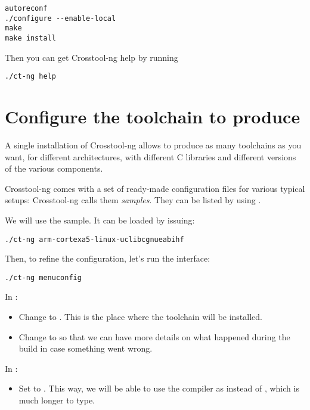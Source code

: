 \begin{verbatim}
autoreconf
./configure --enable-local
make
make install
\end{verbatim}

Then you can get Crosstool-ng help by running

\begin{verbatim}
./ct-ng help
\end{verbatim}

\section{Configure the toolchain to produce}

A single installation of Crosstool-ng allows to produce as many
toolchains as you want, for different architectures, with different C
libraries and different versions of the various components.

Crosstool-ng comes with a set of ready-made configuration files for
various typical setups: Crosstool-ng calls them {\em samples}. They can be
listed by using .

We will use the  sample. It
can be loaded by issuing:

\begin{verbatim}
./ct-ng arm-cortexa5-linux-uclibcgnueabihf
\end{verbatim}

Then, to refine the configuration, let's run the  interface:

\begin{verbatim}
./ct-ng menuconfig
\end{verbatim}

In :

\begin{itemize}
\item Change  to
  . This is the place where
  the toolchain will be installed.
\item Change  to  so that we can have more
  details on what happened during the build in case something went wrong.
\end{itemize}

In :
\begin{itemize}
\item Set  to . This way, we will
  be able to use the compiler as  instead of
  , which is much longer to
  type.
\end{itemize}

